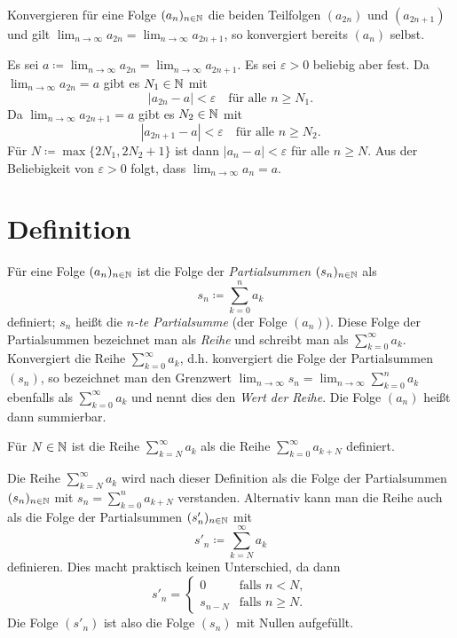\documentclass[a4paper,10pt]{article}
\begin{document}
\begin{question}
 Konvergieren für eine Folge $(a_n)_{n \in \mathbb{N}}$ die beiden Teilfolgen $(a_{2n})$ und $(a_{2n+1})$ und gilt $\lim_{n \to \infty} a_{2n} = \lim_{n \to \infty} a_{2n+1}$, so konvergiert bereits $(a_n)$ selbst.
\end{question}
\begin{solution}
 Es sei $a \coloneqq \lim_{n \to \infty} a_{2n} = \lim_{n \to \infty} a_{2n+1}$. Es sei $\varepsilon > 0$ beliebig aber fest. Da $\lim_{n \to \infty} a_{2n} = a$ gibt es $N_1 \in \mathbb{N}$ mit
 \[
  |a_{2n} - a| < \varepsilon \quad \text{für alle $n \geq N_1$}.
 \]
 Da $\lim_{n \to \infty} a_{2n+1} = a$ gibt es $N_2 \in \mathbb{N}$ mit
 \[
  |a_{2n+1} - a| < \varepsilon \quad \text{für alle $n \geq N_2$}.
 \]
 Für $N \coloneqq \max \{2N_1, 2N_2+1\}$ ist dann $|a_n - a| < \varepsilon$ für alle $n \geq N$. Aus der Beliebigkeit von $\varepsilon > 0$ folgt, dass $\lim_{n \to \infty} a_n = a$.
\end{solution}





\section{Definition}


\begin{defi}
 Für eine Folge $(a_n)_{n \in \mathbb{N}}$ ist die Folge der \emph{Partialsummen} $(s_n)_{n \in \mathbb{N}}$ als
 \[
  s_n \coloneqq \sum_{k=0}^n a_k
 \]
 definiert; $s_n$ heißt die \emph{$n$-te Partialsumme} (der Folge $(a_n)$). Diese Folge der Partialsummen bezeichnet man als \emph{Reihe} und schreibt man als $\sum_{k=0}^\infty a_k$. Konvergiert die Reihe $\sum_{k=0}^\infty a_k$, d.h. konvergiert die Folge der Partialsummen $(s_n)$, so bezeichnet man den Grenzwert $\lim_{n \to \infty} s_n = \lim_{n \to \infty} \sum_{k=0}^n a_k$ ebenfalls als $\sum_{k=0}^\infty a_k$ und nennt dies den \emph{Wert der Reihe}. Die Folge $(a_n)$ heißt dann summierbar.
 
 Für $N \in \mathbb{N}$ ist die Reihe $\sum_{k=N}^\infty a_k$ als die Reihe $\sum_{k=0}^\infty a_{k+N}$ definiert.  
\end{defi}


\begin{bem}
 Die Reihe $\sum_{k=N}^\infty a_k$ wird nach dieser Definition als die Folge der Partialsummen $(s_n)_{n \in \mathbb{N}}$ mit $s_n = \sum_{k=0}^n a_{k+N}$ verstanden. Alternativ kann man die Reihe auch als die Folge der Partialsummen $(s'_n)_{n \in \mathbb{N}}$ mit
 \[
  s'_n \coloneqq \sum_{k=N}^\infty a_k
 \]
 definieren. Dies macht praktisch keinen Unterschied, da dann
 \[
  s'_n =
  \begin{cases}
   0       & \text{falls } n < N, \\
   s_{n-N} & \text{falls } n \geq N.
  \end{cases}
 \]
 Die Folge $(s'_n)$ ist also die Folge $(s_n)$ mit Nullen aufgefüllt.
\end{bem}
\end{document}
